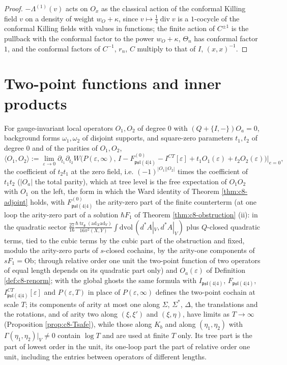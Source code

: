 \begin{proof}
$-\Lambda^{(1)}(v)$ acts on $O_x$ as the classical action of the conformal Killing field $v$ on a density of weight $w_O+\kappa$, since $v\mapsto\tfrac14\operatorname{div}v$ is a $1$-cocycle of the conformal Killing fields with values in functions; the finite action of $C^{\pm1}$ is the pullback with the conformal factor to the power $w_O+\kappa$, $\Theta_n$ has conformal factor $1$, and the conformal factors of $C^{-1}$, $r_n$, $C$ multiply to that of $I$, $(x,x)^{-1}$.
\end{proof}

\section{Two-point functions and inner products}

\begin{definition}
\label{def:c8-2pt}
For gauge-invariant local operators $O_1,O_2$ of degree $0$ with $(Q+\{I,-\})O_a=0$, background forms $\omega_1,\omega_2$ of disjoint supports, and square-zero parameters $t_1,t_2$ of degree $0$ and of the parities of $O_1,O_2$,
\[
\big\langle O_1,O_2\big\rangle:=\lim_{\varepsilon\to0}\partial_{t_1}\partial_{t_2}W\big(P(\varepsilon,\infty),\,I-F^{(0)}_{\mathfrak{psl}(4|4)}-I^{CT}[\varepsilon]+t_1O_1(\varepsilon)+t_2O_2(\varepsilon)\big)\Big|_{e=0},
\]
the coefficient of $t_2t_1$ at the zero field, i.e. $(-1)^{|O_1||O_2|}$ times the coefficient of $t_1t_2$ ($|O_a|$ the total parity), which at tree level is the free expectation of $O_1O_2$ with $O_1$ on the left, the form in which the Ward identity of Theorem \ref{thm:c8-adjoint} holds, with $F^{(0)}_{\mathfrak{psl}(4|4)}$ the arity-zero part of the finite counterterm (at one loop the arity-zero part of a solution $\hbar F_1$ of Theorem \ref{thm:c8-obstruction} (ii): in the quadratic sector $\tfrac{27}{16}\frac{\hbar\operatorname{tr}_{\mathfrak g}(\mathrm{ad}_X\mathrm{ad}_Y)}{16\pi^2(X,Y)}\int\mathrm{dvol}\,(d^*A|_V,d^*A|_V)$ plus $Q$-closed quadratic terms, tied to the cubic terms by the cubic part of the obstruction and fixed, modulo the arity-zero parts of $s$-closed cochains, by the arity-one components of $sF_1=\mathrm{Ob}$; through relative order one unit the two-point function of two operators of equal length depends on its quadratic part only) and $O_a(\varepsilon)$ of Definition \ref{def:c8-renorm}; with the global ghosts the same formula with $I_{\mathfrak{psl}(4|4)}$, $F_{\mathfrak{psl}(4|4)}$, $I^{CT}_{\mathfrak{psl}(4|4)}[\varepsilon]$ and $P(\varepsilon,T)$ in place of $P(\varepsilon,\infty)$ defines the two-point cochain at scale $T$; its components of arity at most one along $\Sigma$, $\Sigma^*$, $\Delta$, the translations and the rotations, and of arity two along $(\xi,\xi')$ and $(\xi,\eta)$, have limits as $T\to\infty$ (Proposition \ref{prop:c8-Tsafe}), while those along $K_b$ and along $(\eta_1,\eta_2)$ with $\Gamma(\eta_1,\eta_2)|_V\neq0$ contain $\log T$ and are used at finite $T$ only. Its tree part is the part of lowest order in the unit, its one-loop part the part of relative order one unit, including the entries between operators of different lengths.
\end{definition}

